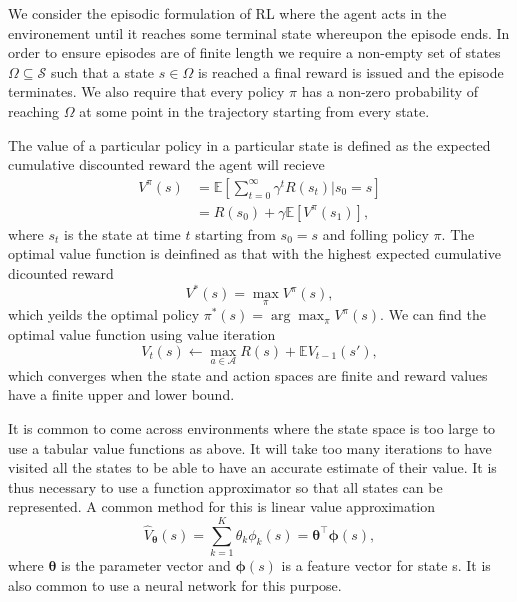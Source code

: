We consider the episodic formulation of RL where the agent acts in the environement until it reaches some terminal state whereupon the episode ends.
In order to ensure episodes are of finite length we require a non-empty set of states $\Omega \subseteq \mathcal{S}$ such that a state $s \in \Omega$ is reached a final reward is issued and the episode terminates.
We also require that every policy $\pi$ has a non-zero probability of reaching $\Omega$ at some point in the trajectory starting from every state.


The value of a particular policy in a particular state is defined as the  expected cumulative discounted reward the agent will recieve 
\begin{align*}
        V^\pi(s) &= \mathbb{E} [ \sum_{t=0}^\infty \gamma^t R(s_t)|s_0=s] \\
        &= R(s_0) + \gamma \mathbb{E} [V^\pi(s_1)],
\end{align*}
where $s_t$ is the state at time $t$ starting from $s_0=s$ and folling policy $\pi$. The optimal value function is deinfined as that with the highest expected cumulative dicounted reward 
\begin{equation*}
    V^*(s) = \max_\pi V^\pi(s),
\end{equation*}
which yeilds the optimal policy $\pi^*(s) = \arg \max_\pi V^\pi(s)$. 
We can find the optimal value function using value iteration
\begin{equation*}
    V_t(s) \leftarrow \max_{a \in \mathcal{A}} R(s) + \mathbb{E} V_{t-1}(s'),
\end{equation*}
which converges when the state and action spaces are finite and reward values have a finite upper and lower bound.

It is common to come across environments where the state space is too large to use a tabular value functions as above. It will take too many iterations to have visited all the states to be able to have an accurate estimate of their value. It is thus necessary to use a function approximator so that all states can be represented. A common method for this is linear value approximation
\begin{equation*}
    \hat{V}_{\boldsymbol{\theta}}(s) = \sum_{k=1}^K \theta_k \phi_k(s) = \boldsymbol{\theta}^\top \boldsymbol{\phi}(s),
\end{equation*}
where $\boldsymbol{\theta}$ is the parameter vector and $\boldsymbol{\phi}(s)$ is a feature vector for state s. It is also common to use a neural network for this purpose.

